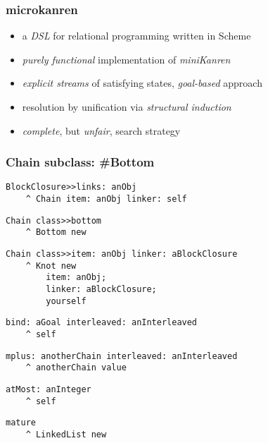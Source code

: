 \documentclass{beamer}
\begin{document}
\begin{frame}[fragile]
\frametitle{microkanren}
\begin{itemize}
\item a \textit{DSL} for relational programming written in Scheme
\item \textit{purely functional} implementation of \textit{miniKanren}
\item \textit{explicit streams} of satisfying states, \textit{goal-based} approach
\item resolution by unification via \textit{structural induction}
\item \textit{complete}, but \textit{unfair}, search strategy
\end{itemize}

\iffalse
my contribution
- _Pythonic_ [implementation][mkpy]: functional at the core, objective at the interface
- generators subsume _countably_-satisfiable relations; complete, _fair_ [search][dovetail]
- _The Reasoned Schemer_ fully tested via [Travis CI][travis]; moreover, [read the docs][rtfd]
- case studies: Smullyan puzzles and combinatorics
- tweaking HOL Light for _certified deductions_, [wip][klight]
\fi
\end{frame}

\begin{frame}[fragile]
\frametitle{Chain subclass: \#Bottom}

\begin{verbatim}
BlockClosure>>links: anObj
    ^ Chain item: anObj linker: self
\end{verbatim}
\begin{verbatim}
Chain class>>bottom
    ^ Bottom new
\end{verbatim}
\begin{verbatim}
Chain class>>item: anObj linker: aBlockClosure
    ^ Knot new 
        item: anObj;
        linker: aBlockClosure;
        yourself
\end{verbatim}
\begin{verbatim}
bind: aGoal interleaved: anInterleaved
    ^ self
\end{verbatim}
\begin{verbatim}
mplus: anotherChain interleaved: anInterleaved
    ^ anotherChain value
\end{verbatim}
\begin{verbatim}
atMost: anInteger
    ^ self
\end{verbatim}
\begin{verbatim}
mature
    ^ LinkedList new
\end{verbatim}
\end{frame}
\end{document}
